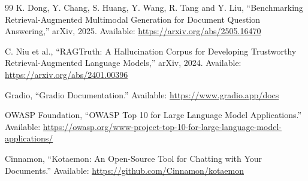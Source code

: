 \documentclass{article}
\begin{document}
\begin{thebibliography}{99}
K. Dong, Y. Chang, S. Huang, Y. Wang, R. Tang and Y. Liu, ``Benchmarking Retrieval-Augmented Multimodal Generation for Document Question Answering,'' arXiv, 2025. Available: \url{https://arxiv.org/abs/2505.16470}

C. Niu et al., ``RAGTruth: A Hallucination Corpus for Developing Trustworthy Retrieval-Augmented Language Models,'' arXiv, 2024. Available: \url{https://arxiv.org/abs/2401.00396}

Gradio, ``Gradio Documentation.'' Available: \url{https://www.gradio.app/docs}

OWASP Foundation, ``OWASP Top 10 for Large Language Model Applications.'' Available: \url{https://owasp.org/www-project-top-10-for-large-language-model-applications/}

Cinnamon, ``Kotaemon: An Open-Source Tool for Chatting with Your Documents.'' Available: \url{https://github.com/Cinnamon/kotaemon}

\end{thebibliography}
\end{document}
